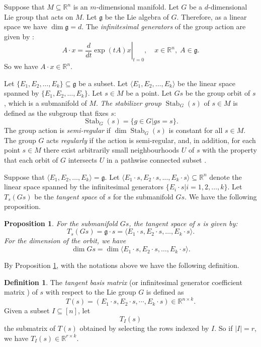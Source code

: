 \documentclass[reqno]{amsart}
\newtheorem{proposition}[theorem]{Proposition}
\theoremstyle{definition}
\newtheorem{definition}[theorem]{Definition}
\numberwithin{equation}{section}
\theoremstyle{remark}
\begin{document}
Suppose that  $M\subseteq \mathbb{R}^n$ is an $m$-dimensional manifold. Let $G$ be a $d$-dimensional Lie group that acts on $M$. Let  $\mathfrak{g}$ be the Lie algebra of $G$. Therefore, as a linear space we have $\dim \mathfrak{g}=d$. The \emph{infinitesimal generators} of the group action are given by \cite[(1.48)]{olver93li}:
\begin{equation}\label{eq-infgen}
A\cdot x =\left.\frac{d}{dt}\exp(tA)x\right|_{t=0},
\quad x \in \mathbb{R}^n,\; A \in \mathfrak{g}.
\end{equation}
So we have $A\cdot x\in \mathbb{R}^n$.


Let $\{E_1,E_2,\ldots,E_k\}\subseteq \mathfrak{g}$ be a subset.
Let $\langle E_1,E_2,\ldots,E_k\rangle$ be the linear space spanned by $\{E_1,E_2,\ldots,E_k\}$.
Let $s\in M$ be a point. Let $Gs$ be the group orbit of $s$, which is a submanifold of $M$. 
\emph{The stabilizer group} $\operatorname{Stab}_G(s)$  of $s\in M$ is defined as the subgroup that fixes $s$:
$$\operatorname{Stab}_G(s)=\{g\in G|gs=s\}.$$
The group action is \emph{semi-regular} if $\dim \operatorname{Stab}_G(s)$ is constant for all $s\in M$. The group $G$ acts \emph{regularly} if the action is semi-regular, and, in addition, for each point $s\in M$ there exist arbitrarily small neighbourhoods $U$ of $s$  with the property that each orbit of $G$ intersects $U$ in a pathwise connected subset \cite{olver93li}.

Suppose that $\langle E_1,E_2,\ldots,E_k\rangle=\mathfrak{g}$. Let $\langle E_1\cdot s, E_2\cdot s,\ldots,E_k\cdot s\rangle \subseteq \mathbb{R}^n$ denote the linear space spanned by the infinitesimal generators $\{ E_i\cdot s|i=1,2,\ldots,k\}$. Let $T_s(Gs)$ be the \emph{tangent space} of $s$ for the submanifold $Gs$. We have the following proposition.
\begin{proposition}\cite[Prop. 2.65]{olver95e}\label{prop-tdim}
 For the submanifold $Gs$, the tangent space of $s$ is given by:
$$T_s (Gs)=\mathfrak{g}\cdot s=\langle E_1\cdot s, E_2\cdot s,\ldots,E_k\cdot s\rangle.$$
For the dimension of the orbit, we have
\begin{equation*}
\dim Gs=\dim \langle E_1\cdot s, E_2\cdot s,\ldots,E_k\cdot s\rangle.
\end{equation*}
\end{proposition}

By Proposition \ref{prop-tdim}, with the notations above we have the following definition.
\begin{definition}\label{def-tsm}
The \emph{tangent basis matrix} (or infinitesimal generator coefficient matrix \cite{folver99mcf, Hubert07sa}) of $s$ with respect to the Lie group $G$ is defined as
\begin{equation}\label{eq-Ts}
T(s)=\left(E_1\cdot s, E_2\cdot s,\cdots,E_k\cdot s\right)
\in \mathbb{R}^{n\times k}.
\end{equation}
Given a subset $I\subseteq [n]$, let 
\begin{equation}\label{eq-Tis}
T_I(s)
\end{equation}
the submatrix of $T(s)$ obtained by selecting
the rows indexed by $I$. So if $|I|=r$, we have $T_I(s)\in \mathbb{R}^{r\times k}$.
\end{definition}
\end{document}
